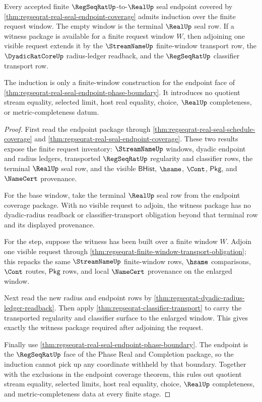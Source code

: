 \begin{theorem}
\label{thm:regseqrat-real-seal-finite-window-witness-induction}
Every accepted finite $\RegSeqRatUp$-to-$\RealUp$ seal endpoint covered by
\autoref{thm:regseqrat-real-seal-endpoint-coverage} admits induction over the
finite request window. The empty window is the terminal $\RealUp$ seal row.
If a witness package is available for a finite request window $W$, then
adjoining one visible request extends it by the $\StreamNameUp$ finite-window
transport row, the $\DyadicRatCoreUp$ radius-ledger readback, and the
$\RegSeqRatUp$ classifier transport row.

The induction is only a finite-window construction for the endpoint face of
\autoref{thm:regseqrat-real-seal-endpoint-phase-boundary}. It introduces no
quotient stream equality, selected limit, host real equality, choice,
$\RealUp$ completeness, or metric-completeness datum.
\end{theorem}
\begin{proof}
First read the endpoint package through
\autoref{thm:regseqrat-real-seal-schedule-coverage} and
\autoref{thm:regseqrat-real-seal-endpoint-coverage}. These two results expose
the finite request inventory: $\StreamNameUp$ windows, dyadic endpoint and
radius ledgers, transported $\RegSeqRatUp$ regularity and classifier rows, the
terminal $\RealUp$ seal row, and the visible $\mathsf{BHist}$, $\hsame$,
$\Cont$, $\mathsf{Pkg}$, and $\NameCert$ provenance.

For the base window, take the terminal $\RealUp$ seal row from the endpoint
coverage package. With no visible request to adjoin, the witness package has no
dyadic-radius readback or classifier-transport obligation beyond that terminal
row and its displayed provenance.

For the step, suppose the witness has been built over a finite window $W$.
Adjoin one visible request through
\autoref{thm:regseqrat-finite-window-transport-obligation}; this repacks the
same $\StreamNameUp$ finite-window rows, $\hsame$ comparisons, $\Cont$ routes,
$\mathsf{Pkg}$ rows, and local $\NameCert$ provenance on the enlarged window.

Next read the new radius and endpoint rows by
\autoref{thm:regseqrat-dyadic-radius-ledger-readback}. Then apply
\autoref{thm:regseqrat-classifier-transport} to carry the transported
regularity and classifier surface to the enlarged window. This gives exactly
the witness package required after adjoining the request.

Finally use \autoref{thm:regseqrat-real-seal-endpoint-phase-boundary}. The
endpoint is the $\RegSeqRatUp$ face of the Phase Real and Completion package,
so the induction cannot pick up any coordinate withheld by that boundary.
Together with the exclusions in the endpoint coverage theorem, this rules out
quotient stream equality, selected limits, host real equality, choice,
$\RealUp$ completeness, and metric-completeness data at every finite stage.
\end{proof}

